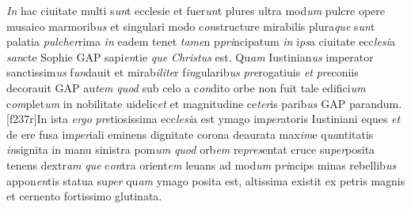 \documentclass[12pt, a4paper]{book}
\newcommand{\styleabbr}[1]{\textit{#1}}
\begin{document}
\styleabbr{In} hac ciuitate multi s\styleabbr{un}t ecclesie et
fuer\styleabbr{un}t plures ultra mod\styleabbr{um} pulcre opere
musaico marmorib\styleabbr{us} et singulari modo
c\styleabbr{on}structure mirabilis plura\styleabbr{que}
s\styleabbr{un}t palatia \styleabbr{pulc}\styleabbr{her}rima
\styleabbr{in} eadem tenet \styleabbr{tame}n
p\styleabbr{pri}ncipatum \styleabbr{in} i\styleabbr{ps}a
ciuitate ecc\styleabbr{lesi}a \styleabbr{san}cte Sophie GAP
sapi\styleabbr{en}tie \styleabbr{que} \styleabbr{Christus} est.
Qu\styleabbr{am} Iustinian\styleabbr{us} imperator
sanctissim\styleabbr{us} f\styleabbr{un}dauit et
mirab\styleabbr{ilite}r f\styleabbr{in}gularib\styleabbr{us}
\styleabbr{pre}rogatiuis \styleabbr{et} \styleabbr{pre}coniis
decorauit GAP au\styleabbr{tem} \styleabbr{quod} sub celo a
c\styleabbr{on}dito orbe non fuit tale edifici\styleabbr{um}
				c\styleabbr{om}plet\styleabbr{um} in nobilitate uidelic\styleabbr{et} et magnitudine ce\styleabbr{ter}is parib\styleabbr{us} GAP parandum.
				[f237r]In ista \styleabbr{ergo} \styleabbr{pre}tiosissima ecc\styleabbr{lesi}a est ymago im\styleabbr{per}atoris Iustiniani eques \styleabbr{et} de ere fusa
				im\styleabbr{per}iali eminens dignitate corona deaurata max\styleabbr{im}e q\styleabbr{ua}ntitatis \styleabbr{in}signita in
				manu sinistra pom\styleabbr{um} \styleabbr{quod} orb\styleabbr{em} re\styleabbr{pres}entat cruce su\styleabbr{per}posita tenens dextr\styleabbr{am} \styleabbr{que} c\styleabbr{on}tra
				orient\styleabbr{em} leuans ad mod\styleabbr{um} p\styleabbr{ri}ncips minas rebellib\styleabbr{us} appon\styleabbr{en}tis statua su\styleabbr{per} qu\styleabbr{am}
				ymago posita est, altissima existit ex petris magnis et cernento fortissimo
				glutinata.
				
	\pend
	
				
			
		
		
	

			\endnumbering
		
\end{document}
